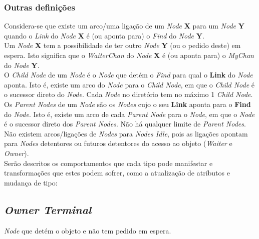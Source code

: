 \subsubsection*{Outras definições}
Considera-se que existe um arco/uma ligação de um \emph{Node} \textbf{X} para um \emph{Node} \textbf{Y} quando o \emph{Link} do 
\emph{Node} \textbf{X}  é (ou aponta para) o \emph{Find} do \emph{Node} \textbf{Y}.
\\

Um \emph{Node} \textbf{X} tem a possibilidade de ter outro \emph{Node} \textbf{Y} (ou o pedido deste) em espera. Isto significa que o \emph{WaiterChan} do 
\emph{Node} \textbf{X} é (ou aponta para) o \emph{MyChan} do \emph{Node} \textbf{Y}.\\

O \emph{Child Node} de um \emph{Node} é o \emph{Node} que detém o \emph{Find} para qual o \textbf{Link} do \emph{Node} aponta. 
Isto é, existe um arco do \emph{Node} para o \emph{Child Node}, em que o \emph{Child Node} é o sucessor direto do \emph{Node}.
Cada \emph{Node} no diretório tem no máximo 1 \emph{Child Node}. \\

Os \emph{Parent Nodes} de um \emph{Node} são os \emph{Nodes} cujo o seu \textbf{Link} aponta para o \textbf{Find} do \emph{Node}.
Isto é, existe um arco de cada \emph{Parent Node} para o \emph{Node}, em que o \emph{Node} é o sucessor direto dos \emph{Parent Nodes}.
Não há qualquer limite de \emph{Parent Nodes}. \\

Não existem arcos/ligações de \emph{Nodes} para \emph{Nodes Idle}, pois as ligações apontam para \emph{Nodes} detentores ou futuros
detentores do acesso ao objeto (\emph{Waiter} e \emph{Owner}). \\







Serão descritos os comportamentos que cada tipo pode manifestar e transformações que estes podem sofrer, como a atualização de atríbutos e mudança de tipo:


\subsection{\emph{Owner Terminal}}
\label{especificacao:nodes:owner_terminal}


\emph{Node} que detém o objeto e não tem pedido em espera.

